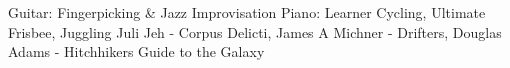 \begin{cvskills}
   {Guitar: Fingerpicking \& Jazz Improvisation \newline
    Piano: Learner}
   {Cycling, Ultimate Frisbee, Juggling}
   {Juli Jeh - Corpus Delicti, James A Michner - Drifters, Douglas Adams - Hitchhikers Guide to the Galaxy}
  \end{cvskills}
